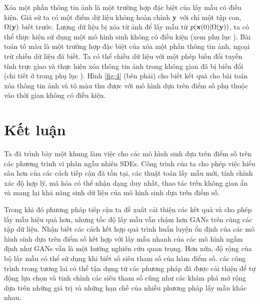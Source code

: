 \documentclass{article} %
\begin{document}
Xóa một phần thông tin ảnh là một trường hợp đặc biệt của lấy mẫu có điều kiện.
Giả sử ta có một điểm dữ liệu không hoàn chỉnh $\bold{y}$ với chỉ một tập con, $\Omega(\bold{y})$ biết trước.
Lượng dữ liệu bị xóa từ ảnh để lấy mẫu từ $p(\bold{x}(0) \vert \Omega(\bold{y}))$, ta có thể thực hiện sử dụng một mô hình sinh không có điều kiện (xem phụ lục ).
Bài toán tô màu là một trường hợp đặc biệt của xóa một phần thông tin ảnh, ngoại trừ chiều dữ liệu đã biết.
Ta có thể chiều dữ liệu với một phép biến đổi tuyến tính trực giao và thực hiện xóa thông tin ảnh trong không gian đã bị biến đổi (chi tiết ở trong phụ lục ).
Hình \ref{fig:4} (bên phải) cho biết kết quả cho bài toán xóa thông tin ảnh và tô màu thu được với mô hình dựa trên điểm số phụ thuộc vào thời gian không có điều kiện.

\section{Kết luận}

Ta đã trình bày một khung làm việc cho các mô hình sinh dựa trên điểm số trên các phương trình vi phân ngẫu nhiên SDEs.
Công trình của ta cho phép việc hiểu sâu hơn của các cách tiếp cận đã tồn tại, các thuật toán lấy mẫu mới, tính chính xác độ hợp lý, mã hóa có thể nhận dạng duy nhất, thao tác trên không gian ẩn và mang lại khả năng sinh dữ liệu của mô hình sinh dựa trên điểm số.

Trong khi đó phương pháp tiếp cận ta đề xuất cải thiện các kết quả và cho phép lấy mẫu hiệu quả hơn, nhưng tốc độ lấy mẫu vẫn chậm hơn GANs \citep{goodfellow2020generative} trên cùng các tập dữ liệu.
Nhận biết các cách kết hợp quá trình huấn luyện ổn định của các mô hình sinh dựa trên điểm số kết hợp với lấy mẫu nhanh của các mô hình ngầm định như GANs vẫn là một hướng nghiên cứu quan trọng.
Hơn nữa, độ rộng của bộ lấy mẫu có thể sử dụng khi biết số siêu tham số của hàm điểm số.
các công trình trong tương lai có thể tận dụng từ các phương pháp đã được cải thiện để tự động lựa chọn và tinh chỉnh các siêu tham số cũng như các khám phá mở rộng dựa trên những giá trị và những hạn chế của nhiều phương pháp lấy mẫu khác nhau.
\newpage


\end{document}

